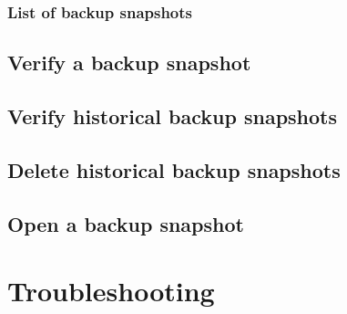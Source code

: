 \subsection{List of backup snapshots}
\section{Verify a backup snapshot}
\section{Verify historical backup snapshots}
\section{Delete historical backup snapshots}
\section{Open a backup snapshot}

\chapter{Troubleshooting}
